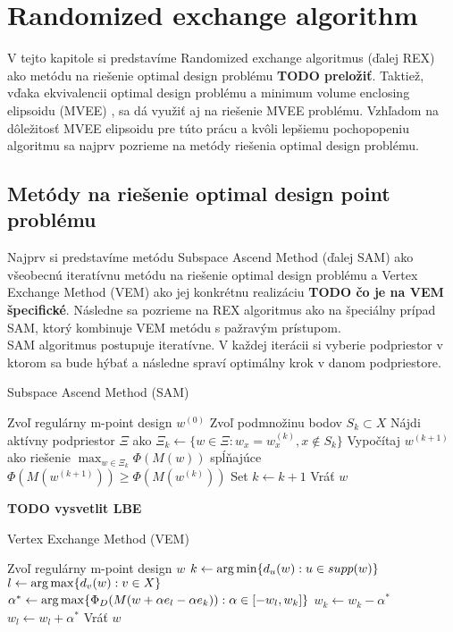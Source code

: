 \chapter{Randomized exchange algorithm}

V tejto kapitole si predstavíme Randomized exchange algoritmus \cite{rex_harman} (ďalej REX) ako metódu na riešenie optimal design problému \textbf{TODO preložiť}. Taktiež, vďaka ekvivalencii optimal design problému a minimum volume enclosing elipsoidu (MVEE) \cite{rex_harman}, sa dá využiť aj na riešenie MVEE problému.
Vzhľadom na dôležitosť MVEE elipsoidu pre túto prácu a kvôli lepšiemu pochopopeniu algoritmu sa najprv pozrieme na metódy riešenia optimal design problému.

\section{Metódy na riešenie optimal design point problému}

Najprv si predstavíme metódu Subspace Ascend Method (ďalej SAM) ako všeobecnú iteratívnu metódu na riešenie optimal design problému a Vertex Exchange Method (VEM) ako jej konkrétnu realizáciu \textbf{TODO čo je na VEM špecifické}. Následne sa pozrieme na REX algoritmus ako na špeciálny prípad SAM, ktorý kombinuje VEM metódu s pažravým prístupom.\\

SAM algoritmus postupuje iteratívne. V každej iterácii si vyberie podpriestor v ktorom sa bude hýbať a následne spraví optimálny krok v danom podpriestore.

\begin{algorithm}[H]
	\caption{Subspace Ascend Method (SAM) \cite{rex_harman}}
	\label{sam}
	\begin{algorithmic}[1]
		\State Zvoľ regulárny m-point design $w^{(0)}$
			\State Zvoľ podmnožinu bodov $S_k \subset X$
			\State Nájdi aktívny podpriestor $\Xi$ ako $\Xi_k \leftarrow \{ w \in \Xi : w_x = w_x^{(k)}, x \not \in S_k \}$
			\State Vypočítaj $w^{(k+1)}$ ako riešenie $\max_{w \in \Xi_k} \Phi(M(w))$ spĺňajúce $\Phi(M(w^{(k+1)})) \geq \Phi(M(w^{(k)}))$
			\State Set $k \leftarrow k+1$
		\EndWhile
		\State Vráť $w$
	\end{algorithmic}
\end{algorithm}

\textbf{TODO vysvetlit LBE}

\begin{algorithm}[H]
	\caption{Vertex Exchange Method (VEM) \cite{rex_harman}}
	\label{vem}
	\begin{algorithmic}[1]
		\State Zvoľ regulárny m-point design $w$
			\State $k \leftarrow \operatorname*{arg\,min} \{ d_u(w) : u \in supp(w)\}$
			\State $l \leftarrow \operatorname*{arg\,max} \{ d_v(w) : v \in X \}$
			\State $\alpha^* \leftarrow \operatorname*{arg\,max} \{ \Phi_D (M(w+\alpha e_l -\alpha e_k)) : \alpha \in [-w_l, w_k] \}$
			\State $w_k \leftarrow w_k - \alpha^*$
			\State $w_l \leftarrow w_l + \alpha^*$
		\EndWhile
		\State Vráť $w$
	\end{algorithmic}
\end{algorithm}

